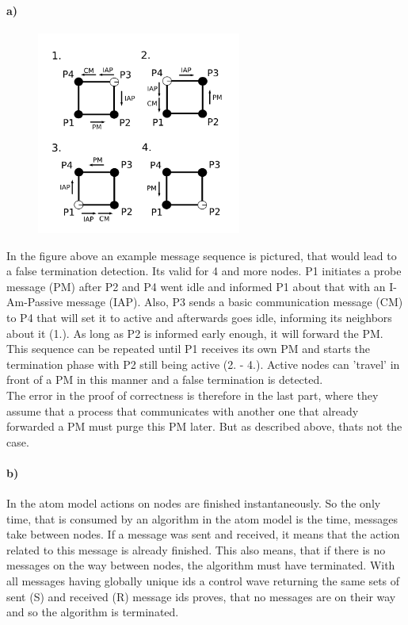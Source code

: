 \documentclass[12pt,a4paper]{article}
\begin{document}
\paragraph*{a)} %
\begin{figure}[h]
\centering
 \includegraphics[width=0.6\textwidth]{2-2.png}
\end{figure}
In the figure above an example message sequence is pictured, that would lead to a false termination detection. Its valid for 4
and more nodes. P1 initiates a probe message (PM) after P2 and P4 went idle and informed P1 about that with an I-Am-Passive
message (IAP). Also, P3 sends a basic communication message (CM) to P4 that will set it to active and afterwards goes idle,
informing its neighbors about it (1.). As long as P2 is informed early enough, it will forward the PM. This sequence can be
repeated until P1 receives its own PM and starts the termination phase with P2 still being active (2. - 4.). Active nodes can
'travel' in front of a PM in this manner and a false termination is detected. \\
The error in the proof of correctness is therefore in the last part, where they assume that a process that communicates with
another one that already forwarded a PM must purge this PM later. But as described above, thats not the case.
\paragraph{b)}
In the atom model actions on nodes are finished instantaneously. So the only time, that is consumed by an algorithm in the atom
model is the time, messages take between nodes. If a message was sent and received, it means that the action related to this
message is already finished. This also means, that if there is no messages on the way between nodes, the algorithm must have
terminated. With all messages having globally unique ids a control wave returning the same sets of sent (S) and received (R)
message ids proves, that no messages are on their way and so the algorithm is terminated.
\end{document}

